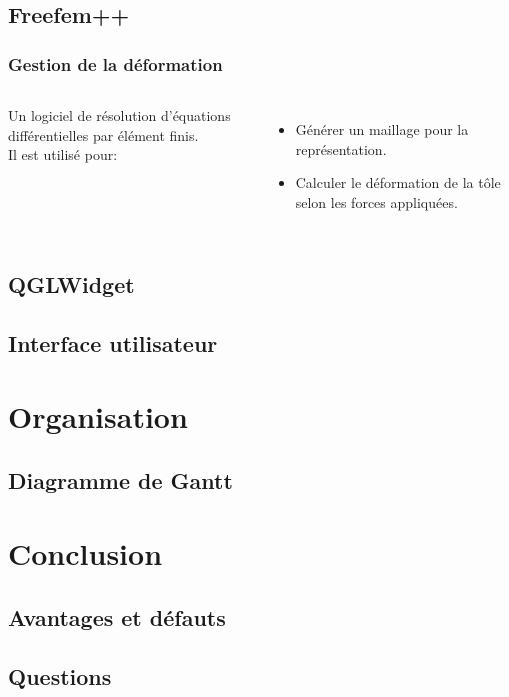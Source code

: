 \documentclass{beamer}
\begin{document}
\subsection{Freefem++}
\begin{frame}
    \frametitle{Gestion de la déformation}
    \begin{columns}
        Un logiciel de résolution d'équations différentielles par élément finis.\\
        Il est utilisé pour:
        \begin{itemize}
            \item Générer un maillage pour la représentation.
            \item Calculer le déformation de la tôle selon les forces appliquées.
        \end{itemize}
    \end{columns}
\end{frame}
\subsection{QGLWidget}
\subsection{Interface utilisateur}

\section{Organisation}
\subsection{Diagramme de Gantt}

\section{Conclusion}
\subsection{Avantages et défauts}
\subsection{Questions}
\end{document}
